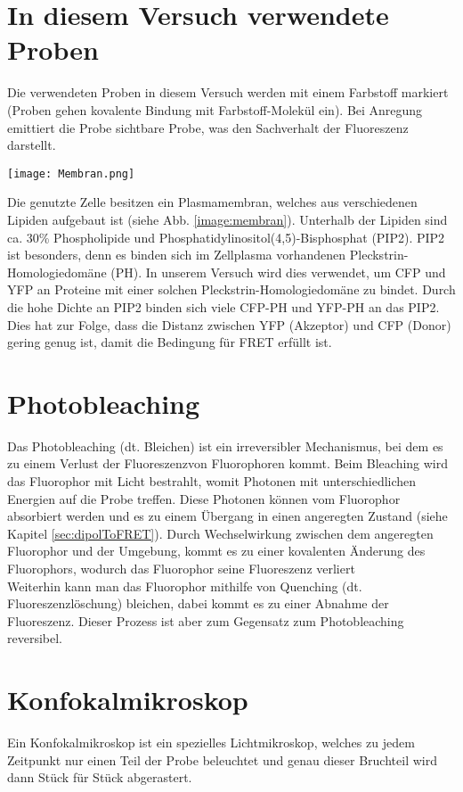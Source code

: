 \section{In diesem Versuch verwendete Proben}
\label{sec:proben}
Die verwendeten Proben in diesem Versuch werden mit einem Farbstoff markiert (Proben gehen kovalente Bindung mit Farbstoff-Molekül ein). Bei Anregung emittiert die Probe sichtbare Probe, was den Sachverhalt der Fluoreszenz darstellt.
\begin{center}
    \texttt{[image: Membran.png]}
    \label{image:membran}
\end{center}
Die genutzte Zelle besitzen ein Plasmamembran, welches aus verschiedenen Lipiden aufgebaut ist (siehe Abb. \ref{image:membran}). Unterhalb der Lipiden sind ca. 30\% Phospholipide und Phosphatidylinositol(4,5)-Bisphosphat (PIP2). PIP2 ist besonders, denn es binden sich im Zellplasma vorhandenen Pleckstrin-Homologiedomäne (PH). In unserem Versuch wird dies verwendet, um CFP und YFP an Proteine mit einer solchen Pleckstrin-Homologiedomäne zu bindet. Durch die hohe Dichte an PIP2 binden sich viele CFP-PH und YFP-PH an das PIP2. Dies hat zur Folge, dass die Distanz zwischen YFP (Akzeptor) und CFP (Donor) gering genug ist, damit die Bedingung für FRET erfüllt ist.
\section{Photobleaching}
\label{sec:bleaching}
Das Photobleaching (dt. Bleichen) ist ein irreversibler Mechanismus, bei dem es zu einem Verlust der Fluoreszenzvon Fluorophoren kommt. Beim Bleaching wird das Fluorophor mit Licht bestrahlt, womit Photonen mit unterschiedlichen Energien auf die Probe treffen. Diese Photonen können vom Fluorophor absorbiert werden und es zu einem Übergang in einen angeregten Zustand (siehe Kapitel \ref{sec:dipolToFRET}). Durch Wechselwirkung zwischen dem angeregten Fluorophor und der Umgebung, kommt es zu einer kovalenten Änderung des Fluorophors, wodurch das Fluorophor seine Fluoreszenz verliert\\ Weiterhin kann man das Fluorophor mithilfe von Quenching (dt. Fluoreszenzlöschung) bleichen, dabei kommt es zu einer Abnahme der Fluoreszenz. Dieser Prozess ist aber zum Gegensatz zum Photobleaching reversibel. \citep{Bleach}
\section{Konfokalmikroskop}
\label{sec:konfokal}
Ein Konfokalmikroskop ist ein spezielles Lichtmikroskop, welches zu jedem Zeitpunkt nur einen Teil der Probe beleuchtet und genau dieser Bruchteil wird dann Stück für Stück abgerastert.
